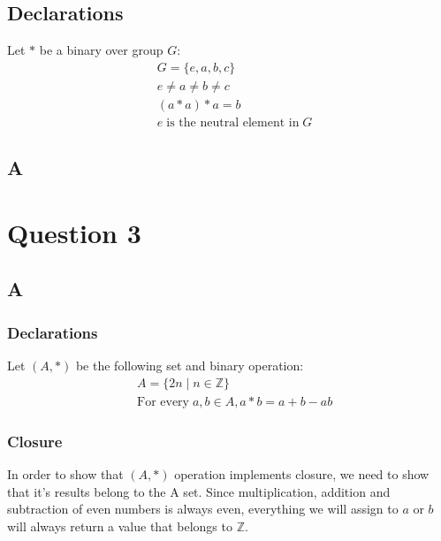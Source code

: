 \documentclass[12pt, oneside]{article}
\begin{document}
\subsection{Declarations}
Let $*$ be a binary over group $G$:
\begin{eqnarray*}
& G = \{e, a, b, c\}\\
& e \neq a \neq b \neq c\\
& (a * a) * a = b\\
& e\;\text{is the neutral element in}\;G
\end{eqnarray*}

\subsection{A}


\clearpage

\section{Question 3}
\subsection{A}
\setcounter{subsubsection}{-1}
\subsubsection{Declarations}
Let $(A, *)$ be the following set and binary operation:
\begin{eqnarray*}
& A = \{2n\;|\;n \in \mathbb{Z}\}\\
& \text{For every}\;a,b \in A, a * b = a + b - ab
\end{eqnarray*}

\subsubsection{Closure}
In order to show that $(A, *)$ operation implements closure, we need to show that it’s results belong to the A set. Since multiplication, addition and subtraction of even numbers is always even, everything we will assign to $a$ or $b$ will always return a value that belongs to $\mathbb{Z}$.
\end{document}
